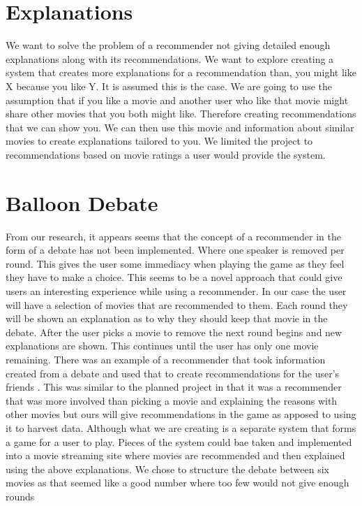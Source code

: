     \section{Explanations}
        We want to solve the problem of a recommender not giving detailed enough explanations along with its recommendations. We want to explore creating a system that creates more explanations for a recommendation than, you might like X because you like Y. 
        It is assumed this is the case. We are going to use the assumption that if you like a movie and another user who like that movie might share other movies that you both might like. Therefore creating recommendations that we can show you. We can then use this movie and information about similar movies to create explanations tailored to you. We limited the project to recommendations based on movie ratings a user would provide the system. 


    \section{Balloon Debate}
        
        From our research, it appears seems that the concept of a recommender in the form of a debate has not been implemented. Where one speaker is removed per round. This gives the user some immediacy when playing the game as they feel they have to make a choice. This seems to be a novel approach that could give users an interesting experience while using a recommender. In our case the user  
        will have a selection of movies that are recommended to them. Each round they will be shown an explanation as to why they should keep that movie in the debate. After the user picks a movie to remove the next round begins and new explanations are shown. This continues until the user has only one movie remaining. There was an example of a recommender that took information created from a debate and used that to create recommendations for the user's friends \cite{10.1145/2792838.2799675}. This was similar to the planned project in  that it was a recommender that was more involved than picking a movie and explaining the reasons with other movies but ours will give recommendations in the game as apposed to using it to harvest data. Although what we are creating is a separate system that forms a game for a user to play. Pieces of the system could bae taken and implemented into a movie streaming site where movies are recommended and then explained using the above explanations. We  chose to structure the debate between six movies as that seemed like a good number where too few would not give enough rounds 


